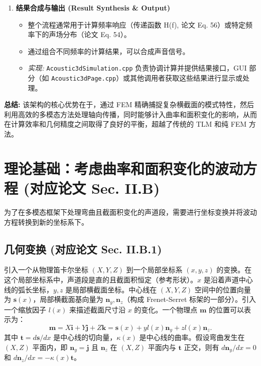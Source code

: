 \documentclass{ctexart}
\begin{document}
\begin{enumerate}
    \item \textbf{结果合成与输出 (Result Synthesis \& Output)}
        \begin{itemize}
            \item 整个流程通常用于计算频率响应（传递函数 H(f), 论文 Eq. 56）或特定频率下的声场分布（论文 Eq. 54）。
            \item 通过组合不同频率的计算结果，可以合成声音信号。
            \item \textit{实现:} \texttt{Acoustic3dSimulation.cpp} 负责协调计算并提供结果接口，GUI 部分（如 \texttt{Acoustic3dPage.cpp}）或其他调用者获取这些结果进行显示或处理。
        \end{itemize}
\end{enumerate}

\textbf{总结:} 该架构的核心优势在于，通过 FEM 精确捕捉复杂横截面的模式特性，然后利用高效的多模态方法处理轴向传播，同时能够计入曲率和面积变化的影响，从而在计算效率和几何精度之间取得了良好的平衡，超越了传统的 TLM 和纯 FEM 方法。

\section{理论基础：考虑曲率和面积变化的波动方程 (对应论文 Sec. II.B)}
为了在多模态框架下处理弯曲且截面积变化的声道段，需要进行坐标变换并将波动方程转换到新的坐标系下。

\subsection{几何变换 (对应论文 Sec. II.B.1)}
引入一个从物理笛卡尔坐标 $(X,Y,Z)$ 到一个局部坐标系 $(x,y,z)$ 的变换。在这个局部坐标系中，声道段是直的且截面积恒定（参考形状）。$x$ 是沿着声道中心线的弧长坐标，$y, z$ 是局部横截面坐标。中心线在 $(X,Y,Z)$ 空间中的位置向量为 $\mathbf{s}(x)$，局部横截面基向量为 $\mathbf{n}_y, \mathbf{n}_z$（构成 Frenet-Serret 标架的一部分）。引入一个缩放因子 $l(x)$ 来描述截面尺寸沿 $x$ 的变化。一个物理点 $\mathbf{m}$ 的位置可以表示为：
\begin{equation} \label{eq:coord_transform}
\mathbf{m} = X \mathbf{i} + Y \mathbf{j} + Z \mathbf{k} = \mathbf{s}(x) + yl(x) \mathbf{n}_{y} + zl(x) \mathbf{n}_{z}.
\end{equation}
其中 $\mathbf{t} = d\mathbf{s}/dx$ 是中心线的切向量，$\kappa(x)$ 是中心线的曲率。假设弯曲发生在 $(X,Z)$ 平面内，即 $\mathbf{n}_y = \mathbf{j}$ 且 $\mathbf{n}_z$ 在 $(X,Z)$ 平面内与 $\mathbf{t}$ 正交，则有 $d\mathbf{n}_y/dx = 0$ 和 $d\mathbf{n}_z/dx = -\kappa(x) \mathbf{t}$。
\end{document}
